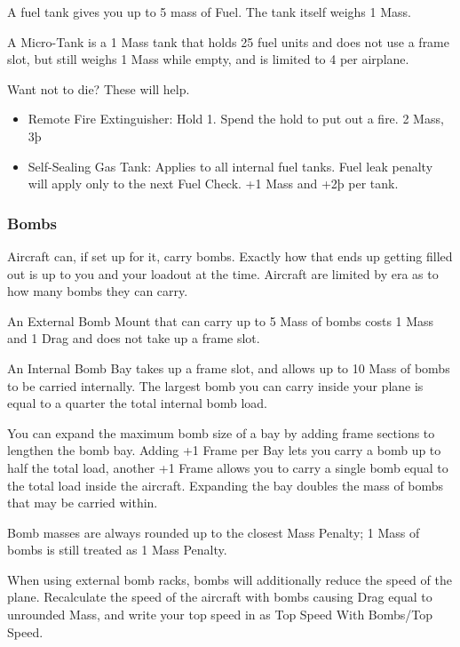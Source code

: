 \documentclass{article}
\begin{document}
A fuel tank gives you up to 5 mass of Fuel. The tank itself weighs 1
Mass.

A Micro-Tank is a 1 Mass tank that holds 25 fuel units and does not use
a frame slot, but still weighs 1 Mass while empty, and is limited to 4
per airplane.

Want not to die? These will help.

\begin{itemize}
    \item          Remote Fire Extinguisher: Hold 1. Spend the hold to put out a
          fire. 2 Mass, 3þ
    \item          Self-Sealing Gas Tank: Applies to all internal fuel tanks. Fuel
          leak penalty will apply only to the next Fuel Check. +1 Mass and +2þ
          per tank.
\end{itemize}

\subsubsection{Bombs}
\label{_Bombs}

Aircraft can, if set up for it, carry bombs. Exactly how that ends up
getting filled out is up to you and your loadout at the time. Aircraft
are limited by era as to how many bombs they can carry.

An External Bomb Mount that can carry up to 5 Mass of bombs costs 1 Mass
and 1 Drag and does not take up a frame slot.

An Internal Bomb Bay takes up a frame slot, and allows up to 10 Mass of
bombs to be carried internally. The largest bomb you can carry inside
your plane is equal to a quarter the total internal bomb load.

You can expand the maximum bomb size of a bay by adding frame sections
to lengthen the bomb bay. Adding +1 Frame per Bay lets you carry a bomb
up to half the total load, another +1 Frame allows you to carry a single
bomb equal to the total load inside the aircraft. Expanding the bay
doubles the mass of bombs that may be carried within.

Bomb masses are always rounded up to the closest Mass Penalty; 1 Mass of
bombs is still treated as 1 Mass Penalty.

When using external bomb racks, bombs will additionally reduce the speed
of the plane. Recalculate the speed of the aircraft with bombs causing
Drag equal to unrounded Mass, and write your top speed in as Top Speed
With Bombs/Top Speed.
\end{document}
